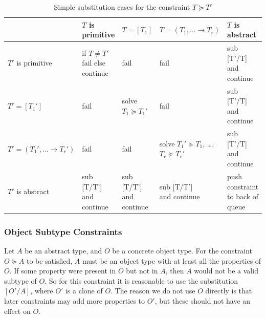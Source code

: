 \documentclass[12pt,a4paper,twoside,openright]{report}
\theoremstyle{definition}
\theoremstyle{dotless}
\begin{document}
\begin{table}[H]
\begin{center}
    \begin{tabular}{ | m{3.5cm} | m{2.5cm} | m{2.5cm} | m{3.4cm} | m{3cm} |}
    \hline
	& $T$ is primitive  &
   		$T=[T_1]$ &
 	   	$T=(T_1, \dots \rightarrow T_r)$ &
 	   	$T$ is abstract \\[5pt] \hline
	$T'$ is primitive   &
   		\parbox[t]{3cm}{if $T\neq T'$ fail\\ else continue}&
 	   	fail &
 	   	fail &
 	   	\parbox[t][1.1cm]{3cm}{sub [T'/T] \\ and continue} \\[10pt] \hline
	$T'=[T_1']$          &
   	  fail &
   	  \parbox[t]{3cm}{solve \\$T_1\succeq T_1'$} &
   	  fail &
 	   	\parbox[t][1.1cm]{3cm}{sub [T'/T] \\ and continue} \\ \hline
	$T'=(T_1', \dots \rightarrow T_r')$ &
   		fail &
 	   	fail &
 	   	\parbox[t][2.3cm]{3cm}{solve \\$T_1'\succeq T_1$,\\ \dots,\\ $T_r\succeq T_r'$} &
 	   	\parbox[t]{3cm}{sub [T'/T] \\ and continue} \\ \hline
	$T'$ is abstract    &
 	   	\parbox[t][1.1cm]{3cm}{sub [T/T'] \\ and continue} &
 	   	\parbox[t]{3cm}{sub [T/T'] \\ and continue}   &
 	   	\parbox[t]{3cm}{sub [T/T'] \\ and continue}  &
   	  push constraint to back of queue \\ \hline
    \end{tabular}
\end{center}
\caption{Simple substitution cases for the constraint $T\succeq T'$}
\label{tab:crc}
\end{table}

\subsubsection*{Object Subtype Constraints} 
Let $A$ be an abstract type, and $O$ be a concrete object type. For the
constraint $O \succeq A$ to be satisfied, $A$ must be an object type with at
least all the properties of $O$. If some property were present in $O$ but not in
$A$, then $A$ would not be a valid subtype of $O$. So for this constraint it is
reasonable to use the substitution $[O'/A]$, where $O'$ is a clone of $O$. The
reason we do not use $O$ directly is that later constraints may add more properties
to $O'$, but these should not have an effect on $O$.
\end{document}
